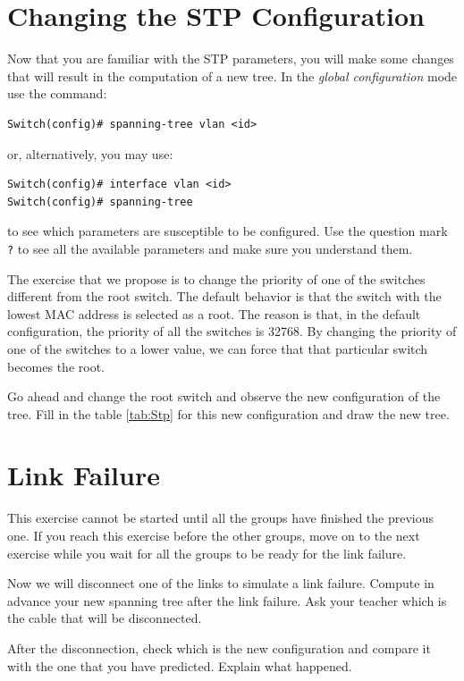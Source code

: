 \section{Changing the STP Configuration}

Now that you are familiar with the STP parameters, you will make some changes that will result in the computation of a new tree. In the \emph{global configuration} mode use the command:

\begin{lstlisting}
Switch(config)# spanning-tree vlan <id>
\end{lstlisting}
or, alternatively, you may use:

\begin{lstlisting}
Switch(config)# interface vlan <id>
Switch(config)# spanning-tree
\end{lstlisting}
to see which parameters are susceptible to be configured. Use the question mark \texttt{\color{blue}?} to see all the available parameters and make sure you understand them.

The exercise that we propose is to change the priority of one of the switches different from the root switch. The default behavior is that the switch with the lowest MAC address is selected as a root. The reason is that, in the default configuration, the priority of all the switches is 32768. By changing the priority of one of the switches to a lower value, we can force that that particular switch becomes the root.

Go ahead and change the root switch and observe the new configuration of the tree. Fill in the table \ref{tab:Stp} for this new configuration and draw the new tree.

\section{Link Failure}

This exercise cannot be started until all the groups have finished the previous one. If you reach this exercise before the other groups, move on to the next exercise while you wait for all the groups to be ready for the link failure.

Now we will disconnect one of the links to simulate a link failure. Compute in advance your new spanning tree after the link failure. Ask your teacher which is the cable that will be disconnected.

After the disconnection, check which is the new configuration and compare it with the one that you have predicted. Explain what happened.

